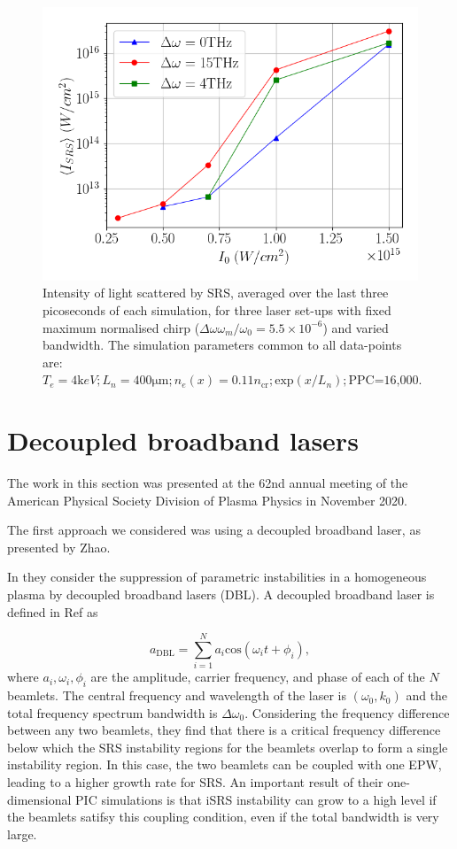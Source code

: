 \begin{figure}[ht]
   \centering
    \includegraphics[width=0.75\columnwidth]{Chapters/C5_broadband/bandwidth_no_dependence_Wen.png}
    \caption{Intensity of light scattered by SRS, averaged over the last three picoseconds of each simulation, for three laser set-ups with fixed maximum normalised chirp ($\Delta\omega \omega_m / \omega_0=5.5\times10^{-6}$) and varied bandwidth. The simulation parameters common to all data-points are: $T_e = 4\si{\kilo eV}; L_n = 400\si{\micro\metre}; n_e(x) = 0.11n_{\text{cr}}; \text{exp}(x/L_n);\text{PPC=16,000}. $}
    \label{fig:Wenreplication}
\end{figure}{}


\section{Decoupled broadband lasers}

The work in this section was presented at the 62nd annual meeting of the American Physical Society Division of Plasma Physics in November 2020.
 
The first approach we considered was using a decoupled broadband laser, as presented by Zhao. 

In \cite{zhao_suppression_2019} they consider the suppression of parametric
instabilities in a homogeneous plasma by decoupled broadband lasers
(\acrshort{DBL}). A
decoupled broadband laser is defined in Ref \cite{zhao_effective_2017} as

\begin{equation}\label{eqn:DBL}
  a_{\mathrm{DBL}} = \sum_{i=1}^{N} a_i \mathrm{cos}(\omega_it + \phi_i),
\end{equation}
where $a_i,\omega_i,\phi_i$ are the amplitude, carrier frequency, and phase of
each of the $N$ beamlets. The central frequency and wavelength of the laser is
$(\omega_0,k_0)$ and the total frequency spectrum bandwidth is
$\Delta\omega_0$.
Considering the frequency difference between any two beamlets, they find that
there is a critical frequency difference below which the SRS instability regions
for the beamlets overlap to form a single instability region. In this case, the
two beamlets can be coupled with one EPW, leading to a higher growth rate for
SRS. An important result of their one-dimensional PIC simulations is that iSRS
instability can grow to a high level if the beamlets satifsy this coupling
condition, even if the total bandwidth is very large.



